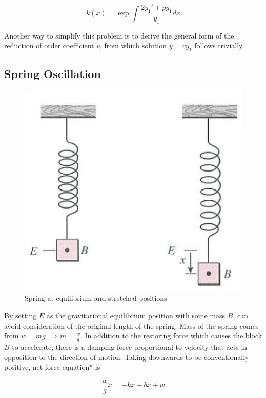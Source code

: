 \begin{equation*}
    k(x)=\exp{\int \frac{2y_1'+py_1}{y_1} dx}
\end{equation*}

Another way to simplify this problem is to derive the general form of the reduction of order coefficient $v$,
from which solution $y=vy_1$ follows trivially.

\subsection{Spring Oscillation}

\begin{figure}[H]
    \centering
    \includegraphics[scale=0.8]{figures/Screen Shot 2021-12-05 at 5.16.10 PM.png}
    \caption{Spring at equilibrium and stretched positions}
\end{figure}

By setting $E$ as the gravitational equilibrium position with some mass $B$, can avoid consideration of the original length of the spring.
Mass of the spring comes from $w=mg\implies m = \frac{w}{g}$. In addition to the restoring force which causes the block $B$ to accelerate, there is a
damping force proportional to velocity that acts in opposition to the direction of motion. Taking downwards to be conventionally positive, net force equation* is

\begin{equation*}
    \frac{w}{g}\ddot x=-kx-b\dot x+w
\end{equation*}

